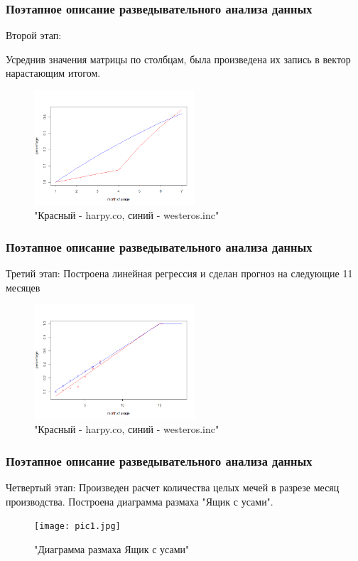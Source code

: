 \documentclass[serif,mathserif]{beamer}
\begin{document}
\begin{frame}
  \frametitle{Поэтапное описание разведывательного анализа данных}
  Второй этап:
  
  Усреднив значения матрицы по столбцам, была произведена их запись в вектор нарастающим итогом.
  \begin{figure}[h]
            \includegraphics[width=60mm]{Graph1.png}
            \caption{"Красный - harpy.co, синий - westeros.inc"}
            \label{Graph}
  \end{figure} 
\end{frame}




\begin{frame}
 \frametitle{Поэтапное описание разведывательного анализа данных}
  Третий этап:
  Построена линейная регрессия и сделан прогноз на следующие 11 месяцев
  
  \begin{figure}[h]
            \includegraphics[width=60mm]{Graph2.png}
            \caption{"Красный - harpy.co, синий - westeros.inc"}
            \label{Graph}
      \end{figure}
 
\end{frame}


\begin{frame}
    \frametitle{Поэтапное описание разведывательного анализа данных}
    Четвертый этап:
    Произведен расчет количества целых мечей в разрезе месяц производства.
    Построена диаграмма размаха "Ящик с усами".
      \begin{figure}[h]
            \texttt{[image: pic1.jpg]}
            \caption{"Диаграмма размаха Ящик с усами"}
            \label{Graph}
      \end{figure}
     
\end{frame}
\end{document}
